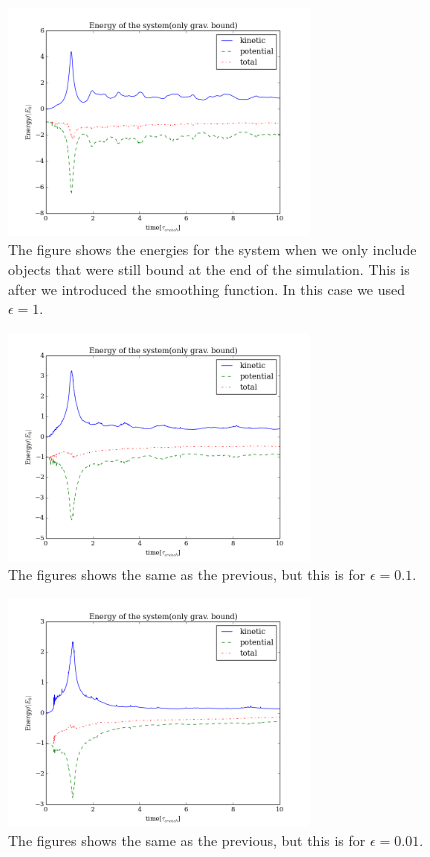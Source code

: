 \documentclass{aa}   %
\begin{document}
\begin{figure}[hbtp]
 \centering
 \includegraphics[width=80mm]{Energy_N100_10Tcrunch_dt0_001_epsilon1.png}
 \caption[]{\label{Energy_N100_10Tcrunch_dt0_001_epsilon1}
   The figure shows the energies for the system when we only include objects that were still bound at the end of the simulation. This is after we introduced the smoothing function. In this case we used $\epsilon = 1$. 
 }
\end{figure}

\begin{figure}[hbtp]
 \centering
 \includegraphics[width=80mm]{Energy_N100_10Tcrunch_dt0_001_epsilon0_1.png}
 \caption[]{\label{Energy_N100_10Tcrunch_dt0_001_epsilon0_1}
   The figures shows the same as the previous, but this is for $\epsilon = 0.1$.
 }
\end{figure}

\begin{figure}[hbtp]
 \centering
 \includegraphics[width=80mm]{Energy_N100_10Tcrunch_dt0_001_epsilon0_01.png}
 \caption[]{\label{Energy_N100_10Tcrunch_dt0_001_epsilon0_01}
   The figures shows the same as the previous, but this is for $\epsilon = 0.01$.
 }
\end{figure}
\end{document}
